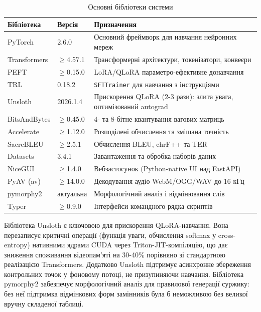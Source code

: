 \documentclass[14pt]{extarticle}
\begin{document}
\captionsetup[table]{justification=raggedleft}
\begin{table}[h]
\caption{Основні бібліотеки системи}
\label{tab:libraries}
\setlength{\tabcolsep}{4pt}
\begin{tabular}{|p{}|p{}|p{}|}
\hline
\textbf{Бібліотека} & \textbf{Версія} & \textbf{Призначення} \\
\hline
PyTorch & 2.6.0 & Основний фреймворк для навчання нейронних мереж \\
\hline
Transformers & $\geq$4.57.1 & Трансформерні архітектури, токенізатори, конвеєри \\
\hline
PEFT & $\geq$0.15.0 & LoRA/QLoRA параметро-ефективне донавчання \\
\hline
TRL & 0.18.2 & \texttt{SFTTrainer} для навчання з інструкціями \\
\hline
Unsloth & 2026.1.4 & Прискорення QLoRA (2-3 рази): злита увага, оптимізований autograd \\
\hline
BitsAndBytes & $\geq$0.45.0 & 4- та 8-бітне квантування вагових матриць \\
\hline
Accelerate & $\geq$1.12.0 & Розподілені обчислення та змішана точність \\
\hline
SacreBLEU & $\geq$2.5.1 & Обчислення BLEU, chrF++ та TER \\
\hline
Datasets & 3.4.1 & Завантаження та обробка наборів даних \\
\hline
NiceGUI & $\geq$1.4.0 & Вебзастосунок (Python-native UI над FastAPI) \\
\hline
PyAV (av) & $\geq$14.0.0 & Декодування аудіо WebM/OGG/WAV до 16 кГц \\
\hline
pymorphy2 & актуальна & Морфологічний аналіз і відмінювання слів \\
\hline
Typer & $\geq$0.9.0 & Інтерфейси командного рядка скриптів \\
\hline
\end{tabular}
\end{table}

Бібліотека Unsloth є ключовою для прискорення QLoRA-навчання. Вона перезаписує критичні операції (функція уваги, обчислення softmax у cross-entropy) нативними ядрами CUDA через Triton-JIT-компіляцію, що дає зниження споживання відеопам'яті на 30-40\% порівняно зі стандартною реалізацією Transformers. Додатково Unsloth підтримує асинхронне збереження контрольних точок у фоновому потоці, не призупиняючи навчання. Бібліотека pymorphy2 забезпечує морфологічний аналіз для правилової генерації суржику: без неї підтримка відмінкових форм замінників була б неможливою без великої вручну складеної таблиці.
\end{document}
